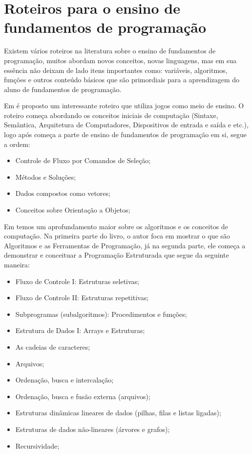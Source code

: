 \documentclass[pnumabnt,normaltoc,espacoumemeio,capchap]{abnt}
\begin{document}
\section{Roteiros para o ensino de fundamentos de programação}
\par Existem vários roteiros na literatura sobre o ensino de fundamentos de programação, muitos abordam novos conceitos, novas linguagens, mas em sua essência não deixam de lado itens importantes como: variáveis, algoritmos, funções e outros conteúdo básicos que são primordiais para a aprendizagem do aluno de fundamentos de programação.
\par Em  é proposto um interessante roteiro que utiliza jogos como meio de ensino. O roteiro começa abordando os conceitos iniciais de computação (Sintaxe, Semântica, Arquitetura de Computadores, Dispositivos de entrada e saída e etc.), logo após começa a parte de ensino de fundamentos de programação em si, segue a ordem:
\begin{itemize}
\item Controle de Fluxo por Comandos de Seleção;
\item Métodos e Soluções;
\item Dados compostos como vetores;
\item Conceitos sobre Orientação a Objetos;
\end{itemize}
\par Em  temos um aprofundamento maior sobre os algoritmos e os conceitos de computação. Na primeira parte do livro, o autor foca em mostrar o que são Algoritmos e as Ferramentas de Programação, já na segunda parte, ele começa a demonstrar e conceituar a Programação Estruturada que segue da seguinte maneira:
\begin{itemize}
\item Fluxo de Controle I: Estruturas seletivas;
\item Fluxo de Controle II: Estruturas repetitivas;
\item Subprogramas (subalgoritmos): Procedimentos e funções;
\item Estrutura de Dados I: Arrays e Estruturas;
\item As cadeias de caracteres;
\item Arquivos;
\item Ordenação, busca e intercalação;
\item Ordenação, busca e fusão externa (arquivos);
\item Estruturas dinâmicas lineares de dados (pilhas, filas e listas ligadas);
\item Estruturas de dados não-lineares (árvores e grafos);
\item Recursividade;
\end{itemize}
\end{document}
